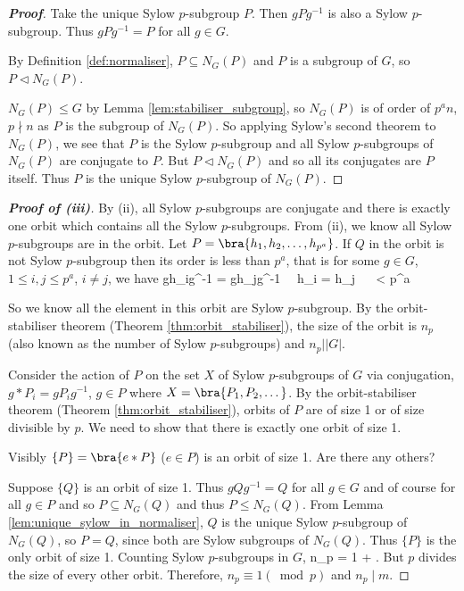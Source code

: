 \begin{proof}[\bf Proof]
Take the unique Sylow $p$-subgroup $P$. Then $gPg^{-1}$ is also a Sylow $p$-subgroup. Thus $gPg^{-1} = P$ for all $g \in G$.

By Definition \ref{def:normaliser}, $P\subseteq N_G(P)$ and $P$ is a subgroup of $G$, so $P \lhd N_G(P)$.

$N_G(P)\leq G$ by Lemma \ref{lem:stabiliser_subgroup}, so $N_G(P)$ is of order of $p^an$, $p\nmid n$ as $P$ is the subgroup of $N_G(P)$. So applying Sylow's second theorem to $N_G(P)$, we see that $P$ is the Sylow $p$-subgroup and all Sylow $p$-subgroups of $N_G(P)$ are conjugate to $P$. But $P \lhd N_G(P)$ and so all its conjugates are $P$ itself. Thus $P$ is the unique Sylow $p$-subgroup of $N_G(P)$.
\end{proof}


\begin{proof}[\bf Proof of (iii)]
By (ii), all Sylow $p$-subgroups are conjugate and there is exactly one orbit which contains all the Sylow $p$-subgroups. From (ii), we know all Sylow $p$-subgroups are in the orbit. Let $P = \bra{h_1,h_2,\dots, h_{p^a}}$. If $Q$ in the orbit is not Sylow $p$-subgroup then its order is less than $p^a$, that is for some $g\in G$, $1\leq i,j\leq p^a$, $i\neq j$, we have
\be
gh_ig^{-1} = gh_jg^{-1} \ \ra \ h_i = h_j \ \ra \  < p^a
\ee

So we know all the element in this orbit are Sylow $p$-subgroup. By the orbit-stabiliser theorem (Theorem \ref{thm:orbit_stabiliser}), the size of the orbit is $n_p$ (also known as the number of Sylow $p$-subgroups) and $n_p | |G|$.

Consider the action of $P$ on the set $X$ of Sylow $p$-subgroups of $G$ via conjugation, $g* P_i = gP_ig^{-1}$, $g\in P$ where $X=\bra{P_1,P_2,\dots}$. By the orbit-stabiliser theorem (Theorem \ref{thm:orbit_stabiliser}), orbits of $P$ are of size 1 or of size divisible by $p$. We need to show that there is exactly one orbit of size 1.

Visibly $\{P\} = \bra{e*P}$ ($e\in P$) is an orbit of size 1. Are there any others?

Suppose $\{Q\}$ is an orbit of size 1. Thus $gQg^{-1} = Q$ for all $g \in G$ and of course for all $g \in P$ and so $P\subseteq N_G(Q)$ and thus $P \leq N_G(Q)$. From Lemma \ref{lem:unique_sylow_in_normaliser}, $Q$ is the unique Sylow $p$-subgroup of $N_G(Q)$, so $P =Q$, since both are Sylow subgroups of $N_G(Q)$. Thus $\{P\}$ is the only orbit of size 1. Counting Sylow $p$-subgroups in $G$,
\be
n_p = 1 + .
\ee
But $p$ divides the size of every other orbit. Therefore, $n_p \equiv 1 (\bmod p)$ and $n_p \mid m$.
\end{proof}

